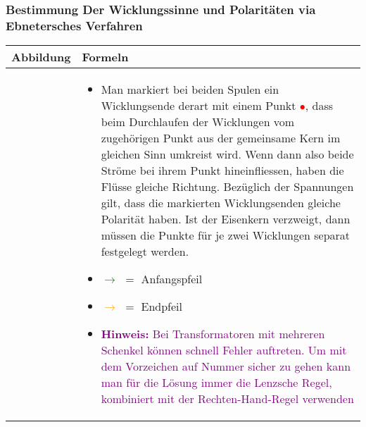 \subsubsection{Bestimmung Der Wicklungssinne und Polaritäten via Ebnetersches Verfahren} 
\begin{tabular}{ | m{7cm} | m{11cm}  | }
	\hline
	Abbildung & Formeln \\ \hline
	\hline
	\begin{minipage}{.1\textwidth}
		\tabImg[width=6cm]{images/Punktkonvention.png}
	\end{minipage}
	&
	\begin{itemize}
		\item[] Man markiert bei beiden Spulen ein Wicklungsende derart mit einem Punkt \textcolor{red}{$\bullet$}, dass beim Durchlaufen der Wicklungen vom zugehörigen Punkt aus der gemeinsame Kern im gleichen Sinn umkreist wird. Wenn dann also beide Ströme bei ihrem Punkt hineinfliessen, haben die Flüsse gleiche Richtung. Bezüglich der Spannungen gilt, dass die markierten Wicklungsenden gleiche Polarität haben. Ist der Eisenkern verzweigt, dann müssen die Punkte für je zwei Wicklungen separat festgelegt werden.
		\item[] \textcolor{green}{$\mathbf{\rightarrow}$} $=$ Anfangspfeil
		\item[] \textcolor{orange}{$\mathbf{\rightarrow}$} $=$ Endpfeil
		\item[] \textcolor{purple}{\textbf{Hinweis:} Bei Transformatoren mit mehreren Schenkel können schnell Fehler auftreten. Um mit dem Vorzeichen auf Nummer sicher zu gehen kann man für die Lösung immer die Lenzsche Regel, kombiniert mit der Rechten-Hand-Regel verwenden}
	\end{itemize}   	
	\\ \hline
\end{tabular}
\newpage

